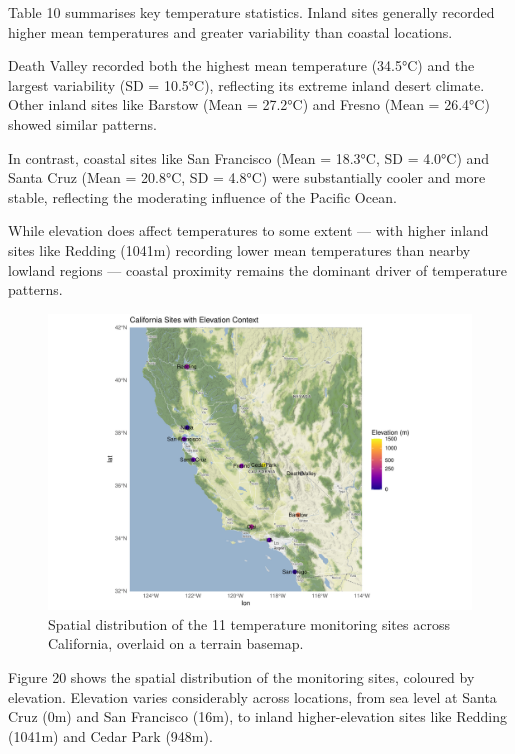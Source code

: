 \documentclass[
  11pt,
]{article}
\begin{document}
Table 10 summarises key temperature statistics. Inland sites generally
recorded higher mean temperatures and greater variability than coastal
locations.

Death Valley recorded both the highest mean temperature (34.5°C) and the
largest variability (SD = 10.5°C), reflecting its extreme inland desert
climate. Other inland sites like Barstow (Mean = 27.2°C) and Fresno
(Mean = 26.4°C) showed similar patterns.

In contrast, coastal sites like San Francisco (Mean = 18.3°C, SD =
4.0°C) and Santa Cruz (Mean = 20.8°C, SD = 4.8°C) were substantially
cooler and more stable, reflecting the moderating influence of the
Pacific Ocean.

While elevation does affect temperatures to some extent --- with higher
inland sites like Redding (1041m) recording lower mean temperatures than
nearby lowland regions --- coastal proximity remains the dominant driver
of temperature patterns.

\begin{figure}[H]

{\centering \includegraphics{project_files/figure-pdf/ca_map_elevation-1.pdf}

}

\caption{Spatial distribution of the 11 temperature monitoring sites
across California, overlaid on a terrain basemap.}

\end{figure}%

Figure 20 shows the spatial distribution of the monitoring sites,
coloured by elevation. Elevation varies considerably across locations,
from sea level at Santa Cruz (0m) and San Francisco (16m), to inland
higher-elevation sites like Redding (1041m) and Cedar Park (948m).
\end{document}
